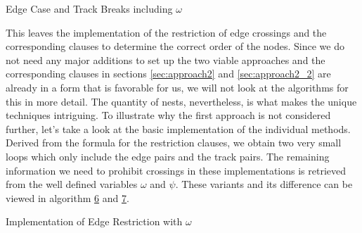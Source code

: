\documentclass[bachelor, english]{algothesis}
\begin{document}
\begin{algorithm}[ht]
    \caption{Edge Case and Track Breaks including $\omega$}
    \label{alg:edgeCase}
\end{algorithm}
\noindent
This leaves the implementation of the restriction of edge crossings and the corresponding clauses to determine the correct order of the nodes. Since we do not need any major additions to set up the two viable approaches and the corresponding clauses in sections \ref{sec:approach2} and \ref{sec:approach2_2} are already in a form that is favorable for us, we will not look at the algorithms for this in more detail. The quantity of nests, nevertheless, is what makes the unique techniques intriguing. To illustrate why the first approach is not considered further, let's take a look at the basic implementation of the individual methods. Derived from the formula for the restriction clauses, we obtain two very small loops which only include the edge pairs and the track pairs. The remaining information we need to prohibit crossings in these implementations is retrieved from the well defined variables $\omega$ and $\psi$. These variants and its difference can be viewed in algorithm \hyperlink{alg:edgeRestriction2.1}{6} and \hyperlink{alg:edgeRestriction2.2}{7}.
\begin{algorithm}[ht]
    \caption{Implementation of Edge Restriction with $\omega$}
    \label{alg:edgeRestriction2.1}
\end{algorithm}
\end{document}
